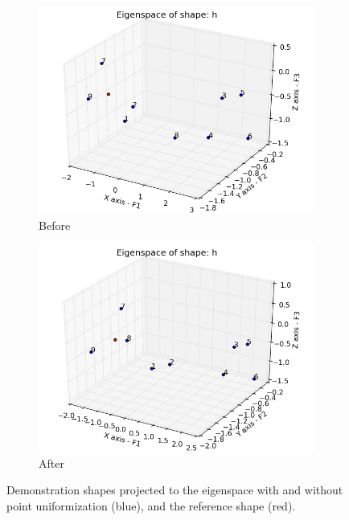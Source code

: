 \begin{figure}[h!]
        \centering
        \begin{subfigure}{0.4\textwidth}
                \includegraphics[width=1\textwidth]{figures/eigenBefore.png}
                \caption{Before}
                \label{fig:eigenBefore}
        \end{subfigure}
        \begin{subfigure}{0.4\textwidth}
                \includegraphics[width=1\textwidth]{figures/eigenAfter.png}
                \caption{After}
                \label{fig:eigenAfter}
        \end{subfigure}
        \caption{Demonstration shapes projected to the eigenspace with and without point uniformization (blue), and the reference shape (red).}
        \label{fig:eigenspaces}
\end{figure}


